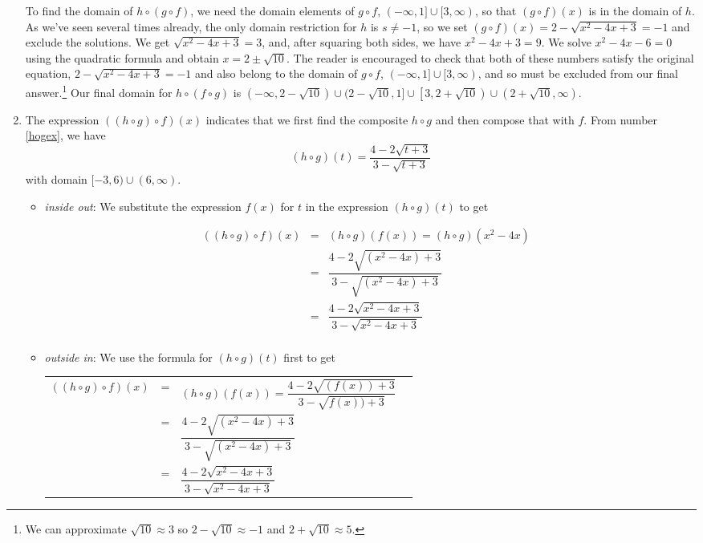 \begin{ex}
\begin{enumerate}
\begin{itemize}
 \end{itemize}
 
To find the domain of $h \circ (g \circ f)$, we need the domain elements of $g \circ f$, $(-\infty, 1] \cup [3,\infty)$, so that $(g \circ f)(x)$ is in the domain of $h$.  As we've seen several times already, the only domain restriction for $h$ is $s \neq -1$, so we set  $(g \circ f)(x) = 2 - \sqrt{x^2-4x+3} = -1$ and exclude the solutions.     We get $\sqrt{x^2-4x+3} = 3$, and, after squaring both sides, we have $x^2-4x+3 = 9$.  We solve $x^2-4x-6 = 0$ using the quadratic formula and obtain $x = 2 \pm \sqrt{10}$.  The reader is encouraged to check that both of these numbers satisfy the original equation, $2 - \sqrt{x^2-4x+3} = -1$ and also belong to the domain of $g \circ f$, $(-\infty, 1] \cup [3,\infty)$, and so must be excluded from our final answer.\footnote{We can approximate $\sqrt{10} \approx 3$ so $2-\sqrt{10} \approx -1$ and $2+\sqrt{10} \approx 5$.}   Our final domain for $h \circ (f \circ g)$ is $(-\infty, 2 -\sqrt{10}) \cup (2 - \sqrt{10}, 1] \cup \left[3, 2 + \sqrt{10}\right) \cup \left(2+\sqrt{10}, \infty\right)$.

\item  The expression $((h \circ g) \circ f)(x)$ indicates that we first find the composite $h \circ g$ and then compose that with $f$.  From number \ref{hogex}, we have \[(h \circ g)(t) = \frac{4-2\sqrt{t+3}}{3-\sqrt{t+3}}\]  with domain $[-3, 6) \cup (6, \infty)$.
\begin{itemize}

\item  \textit{inside out}: We substitute the expression $f(x)$ for $t$ in the expression $(h \circ g)(t)$ to get 

\[ \begin{array}{rclr}
((h \circ g) \circ f)(x) & = & (h \circ g)(f(x)) = (h \circ g)\left(x^2-4x\right) & \\ [2pt]
                         & = & \dfrac{4-2\sqrt{\left(x^2-4x\right)+3}}{3-\sqrt{\left(x^2-4x\right)+3}} & \\ [20pt]
                         & = & \dfrac{4 - 2\sqrt{x^2-4x+3}}{3 - \sqrt{x^2-4x+3}} & \\ \end{array}\]

\item  \textit{outside in}:  We use the formula for $(h \circ g)(t)$ first to get
\begin{longtable}{rclr} $((h \circ g) \circ f)(x)$ & = & $(h \circ g)(f(x))=\dfrac{4-2\sqrt{(f(x))+3}}{3-\sqrt{f(x))+3}}$  & \\ [20pt]
  & = & $\dfrac{4 - 2\sqrt{\left(x^2-4x\right)+3}}{3 - \sqrt{\left(x^2-4x\right)+3}}$ & \\[20pt]
 & = & $\dfrac{4 - 2\sqrt{x^2-4x+3}}{3 - \sqrt{x^2-4x+3}}$ & \\
 \end{longtable}
 

\end{itemize}
\end{enumerate}
\end{ex}
